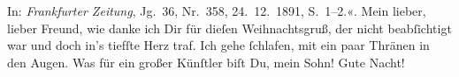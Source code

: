 \begin{ledgroupsized}[t]{13cm}
{{{                     In: \emph{Frankfurter Zeitung}, Jg. 36, Nr. 358,
                        24. 12. 1891, S. 1–2.}}}\label{K_L02677-3h}«. Mein lieber, lieber
               Freund, wie danke ich Dir für dieſen Weihnachtsgruß, der nicht beabſichtigt war und
               doch in’s tiefſte Herz traf. Ich gehe ſchlafen, mit ein paar Thränen in den Augen.
               Was für ein großer Künſtler biſt Du, mein Sohn!\pend
           \pstart
           Gute Nacht!\pend
                     \endnumbering{}\end{ledgroupsized}  \newcommand{\dateiname}{L02677}\newcommand{\titel}{Paul Goldmann an Arthur Schnitzler, 24. 12. [1891]}\newcommand{\editorInnen}{Martin Anton Müller und Laura Untner}
            \footnotesize
\begin{ledgroupsized}[t]{11.5cm}
\end{ledgroupsized}
         
      